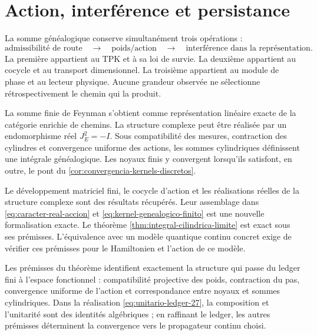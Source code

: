 \section{Action, interférence et persistance}

La somme généalogique conserve simultanément trois opérations :
\[
 \text{admissibilité de route}
 \quad\longrightarrow\quad
 \text{poids/action}
 \quad\longrightarrow\quad
 \text{interférence dans la représentation}.
\]
La première appartient au TPK et à sa loi de survie. La deuxième appartient
au cocycle et au transport dimensionnel. La troisième appartient au module de
phase et au lecteur physique. Aucune grandeur observée ne sélectionne
rétrospectivement le chemin qui la produit.

\begin{resultbox}
La somme finie de Feynman s'obtient comme représentation linéaire exacte de la
catégorie enrichie de chemins. La structure complexe peut être réalisée par un
endomorphisme réel \(J_E^2=-I\). Sous compatibilité des mesures, contraction des
cylindres et convergence uniforme des actions, les sommes cylindriques définissent
une intégrale généalogique. Les noyaux finis y convergent lorsqu'ils
satisfont, en outre, le pont du
\cref{cor:convergencia-kernels-discretos}.
\end{resultbox}

\begin{statusbox}
Le développement matriciel fini, le cocycle d'action et les réalisations réelles
de la structure complexe sont des résultats récupérés. Leur assemblage dans
\eqref{eq:caracter-real-accion} et \eqref{eq:kernel-genealogico-finito} est une
nouvelle formalisation exacte. Le théorème \ref{thm:integral-cilindrica-limite} est
exact sous ses prémisses. L'équivalence avec un modèle quantique continu
concret exige de vérifier ces prémisses pour le Hamiltonien et l'action de
ce modèle.
\end{statusbox}

Les prémisses du théorème identifient exactement la structure qui passe du
ledger fini à l'espace fonctionnel : compatibilité projective des poids,
contraction du pas, convergence uniforme de l'action et correspondance
entre noyaux et sommes cylindriques. Dans la réalisation
\eqref{eq:unitario-ledger-27}, la composition et l'unitarité sont des identités
algébriques ; en raffinant le ledger, les autres prémisses déterminent la
convergence vers le propagateur continu choisi.
